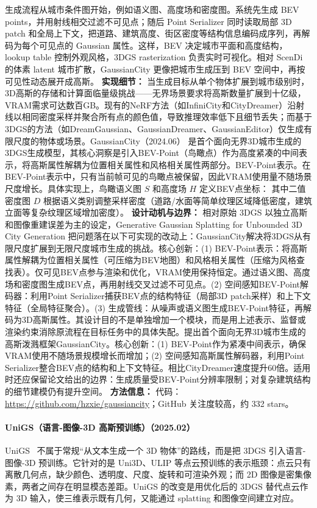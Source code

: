 生成流程从城市条件图开始，例如语义图、高度场和密度图。系统先生成 BEV points，并用射线相交过滤不可见点；随后 Point Serializer 同时读取局部 3D patch 和全局上下文，把道路、建筑高度、街区密度等结构信息编码成序列，再解码为每个可见点的 Gaussian 属性。这样，BEV 决定城市平面和高度结构，lookup table 控制外观风格，3DGS rasterization 负责实时可视化。相对 ScenDi 的体素 latent 城市扩散，GaussianCity 更像把城市生成压到 BEV 空间中，再按可见性动态展开成高斯。
\textbf{实现细节：} 当生成目标从单个物体扩展到城市级别时，3D高斯的存储和计算面临量级挑战——无界场景要求将高斯数量扩展到十亿级，VRAM需求可达数百GB。现有的NeRF方法（如InfiniCity和CityDreamer）沿射线以相同密度采样并聚合所有点的颜色值，导致推理效率低下且细节丢失；而基于3DGS的方法（如DreamGaussian、GaussianDreamer、GaussianEditor）仅生成有限尺度的物体或场景。GaussianCity（2024.06） 是首个面向无界3D城市生成的3DGS生成模型，其核心洞察是引入BEV-Point（鸟瞰点）作为高度紧凑的中间表示，将高斯属性解耦为位置相关属性和风格相关属性两部分。BEV-Point表示。在BEV-Point表示中，只有当前帧可见的鸟瞰点被保留，因此VRAM使用量不随场景尺度增长。具体实现上，鸟瞰语义图 $S$ 和高度场 $H$ 定义BEV点坐标： 其中二值密度图 $D$ 根据语义类别调整采样密度（道路/水面等简单纹理区域降低密度，建筑立面等复杂纹理区域增加密度）。
\textbf{设计动机与边界：} 相对原始 3DGS 以独立高斯和图像重建误差为主的设定，Generative Gaussian Splatting for Unbounded 3D City Generation 把问题落在以下可实现的改动上：GaussianCity解决将3DGS从有限尺度扩展到无限尺度城市生成的挑战。核心创新：(1) BEV-Point表示：将高斯属性解耦为位置相关属性（可压缩为BEV地图）和风格相关属性（压缩为风格查找表）。仅可见BEV点参与渲染和优化，VRAM使用保持恒定。通过语义图、高度场和密度图生成BEV点，再用射线交叉过滤不可见点。(2) 空间感知BEV-Point解码器：利用Point Serializer捕获BEV点的结构特征（局部3D patch采样）和上下文特征（全局特征聚合）。(3) 生成管线：从噪声或语义图生成BEV-Point特征，再解码为3D高斯属性。其设计目的不是单独增加一个模块，而是用上述表示、监督或渲染约束消除原流程在目标任务中的具体失配。提出首个面向无界3D城市生成的高斯泼溅框架GaussianCity。核心创新：(1) BEV-Point作为紧凑中间表示，确保VRAM使用不随场景规模增长而增加；(2) 空间感知高斯属性解码器，利用Point Serializer整合BEV点的结构和上下文特征。相比CityDreamer速度提升60倍。适用时还应保留论文给出的边界：生成质量受BEV-Point分辨率限制；对复杂建筑结构的细节建模仍有提升空间。
\textbf{方法信息：} 代码：\url{https://github.com/hzxie/gaussiancity}；GitHub 关注度较高，约 332 stars。



\paragraph{UniGS（语言-图像-3D 高斯预训练）（2025.02）}
UniGS~\cite{2502_17860} 不属于常规“从文本生成一个 3D 物体”的路线，而是把 3DGS 引入语言-图像-3D 预训练。它针对的是 Uni3D、ULIP 等点云预训练的表示瓶颈：点云只有离散几何点，缺少颜色、透明度、尺度、旋转和可渲染外观；而 2D 图像是密集像素，两者之间存在明显模态差距。UniGS 的改变是用优化后的 3DGS 替代点云作为 3D 输入，使三维表示既有几何，又能通过 splatting 和图像空间建立对应。

